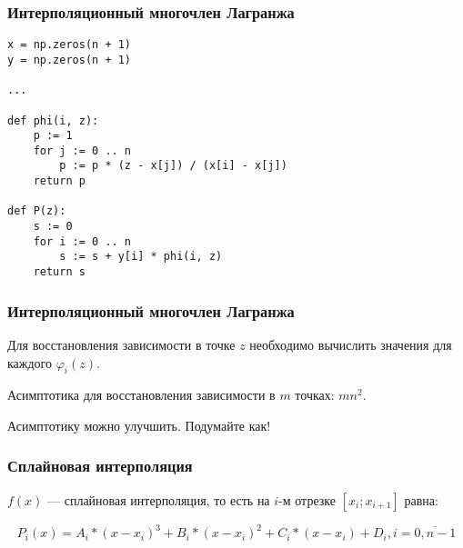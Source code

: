 \documentclass[10pt]{beamer}
\begin{document}
\begin{frame}[fragile]
\frametitle{Интерполяционный многочлен Лагранжа}

\begin{lstlisting}
x = np.zeros(n + 1)
y = np.zeros(n + 1)

...

def phi(i, z):
	p := 1
	for j := 0 .. n
		p := p * (z - x[j]) / (x[i] - x[j])
	return p

def P(z):
	s := 0
	for i := 0 .. n
		s := s + y[i] * phi(i, z)
	return s
\end{lstlisting}
\end{frame}

\begin{frame}[fragile]
\frametitle{Интерполяционный многочлен Лагранжа}

Для восстановления зависимости в точке $z$ необходимо вычислить значения для каждого $\varphi_i(z)$. 

\vfill

Асимптотика для восстановления зависимости в $m$ точках: $m n^2$. 


\vfill

Асимптотику можно улучшить. Подумайте как!
\end{frame}

\begin{frame}[fragile]
\frametitle{Сплайновая интерполяция}

$f(x)$ --- сплайновая интерполяция, то есть на $i$-м отрезке $[x_{i}; x_{i+1}]$ равна:

$$ P_i(x) = A_i * (x - x_{i})^3 + B_i * (x - x_{i})^2 + C_i * (x - x_{i}) + D_i, i = \overline{0,n-1} $$

\begin{center}
\end{center}

\end{frame}
\end{document}
